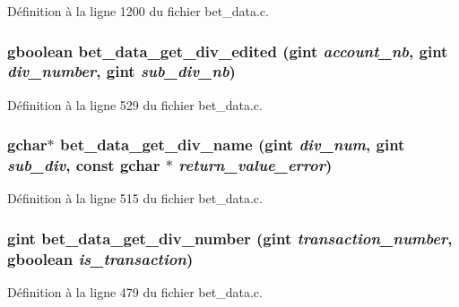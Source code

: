 Définition à la ligne 1200 du fichier bet\_\-data.c.

\subsubsection[{bet\_\-data\_\-get\_\-div\_\-edited}]{\setlength{\rightskip}{0pt plus 5cm}gboolean bet\_\-data\_\-get\_\-div\_\-edited (gint {\em account\_\-nb}, \/  gint {\em div\_\-number}, \/  gint {\em sub\_\-div\_\-nb})}\label{bet__data_8h_a404cd035dc7d1d50729066aa299fe43b}


Définition à la ligne 529 du fichier bet\_\-data.c.

\subsubsection[{bet\_\-data\_\-get\_\-div\_\-name}]{\setlength{\rightskip}{0pt plus 5cm}gchar$\ast$ bet\_\-data\_\-get\_\-div\_\-name (gint {\em div\_\-num}, \/  gint {\em sub\_\-div}, \/  const gchar $\ast$ {\em return\_\-value\_\-error})}\label{bet__data_8h_aea9c573187265658d763308e06b90b05}


Définition à la ligne 515 du fichier bet\_\-data.c.

\subsubsection[{bet\_\-data\_\-get\_\-div\_\-number}]{\setlength{\rightskip}{0pt plus 5cm}gint bet\_\-data\_\-get\_\-div\_\-number (gint {\em transaction\_\-number}, \/  gboolean {\em is\_\-transaction})}\label{bet__data_8h_ab4bf76da9537ef326910893cb8efca75}


Définition à la ligne 479 du fichier bet\_\-data.c.

